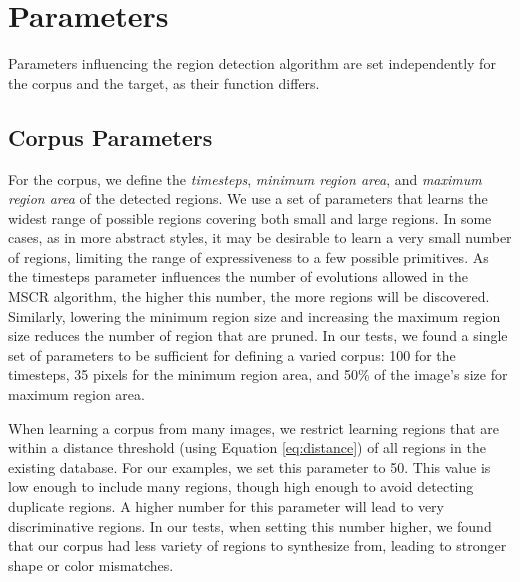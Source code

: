 \documentclass[a4paper,10pt,final]{ThesisStyle}
\begin{document}
\section{Parameters}  
Parameters influencing the region detection algorithm are set independently for the corpus and the target, as their function differs.
\subsection{Corpus Parameters}\vspace{-0.4em}
\label{sec:parameters}
For the corpus, we define the \textit{timesteps}, \textit{minimum region area}, and \textit{maximum region area} of the detected regions.  We use a set of parameters that learns the widest range of possible regions covering both small and large regions.  In some cases, as in more abstract styles, it may be desirable to learn a very small number of regions, limiting the range of expressiveness to a few possible primitives.  As the timesteps parameter influences the number of evolutions allowed in the MSCR algorithm, the higher this number, the more regions will be discovered.  Similarly, lowering the minimum region size and increasing the maximum region size reduces the number of region that are pruned.  In our tests, we found a single set of parameters to be sufficient for defining a varied corpus: 100 for the timesteps, 35 pixels for the minimum region area, and 50\% of the image's size for maximum region area.

When learning a corpus from many images, we restrict learning regions that are within a distance threshold (using Equation \ref{eq:distance}) of all regions in the existing database.  For our examples, we set this parameter to 50.  This value is low enough to include many regions, though high enough to avoid detecting duplicate regions.  A higher number for this parameter will lead to very discriminative regions.  In our tests, when setting this number higher, we found that our corpus had less variety of regions to synthesize from, leading to stronger shape or color mismatches.  
\end{document}
